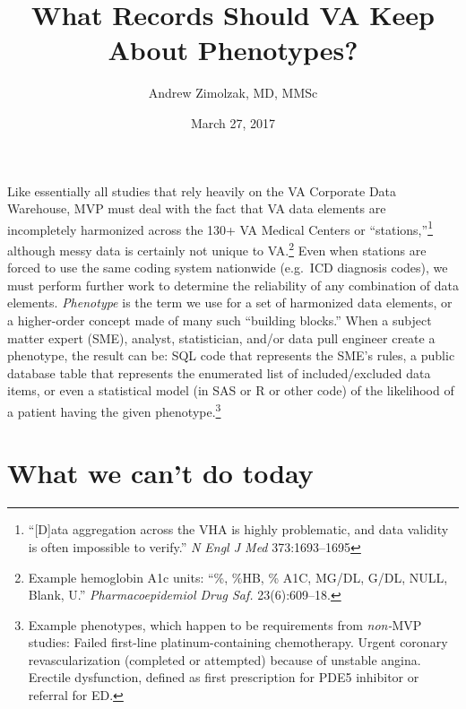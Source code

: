 \documentclass{tufte-handout}
\title{What Records Should VA Keep About Phenotypes?}
\author{Andrew Zimolzak, MD, MMSc}
\date{March 27, 2017}
\begin{document}
\maketitle

Like essentially all studies that rely heavily on the VA Corporate
Data Warehouse, MVP must deal with the fact that VA data elements are
incompletely harmonized across the 130+ VA Medical Centers or
``stations,''\footnote{``[D]ata aggregation across the VHA is highly
  problematic, and data validity is often impossible to verify.''
  \emph{N Engl J Med} 373:1693--1695} although messy data is certainly
not unique to VA.\footnote{Example hemoglobin A1c units: ``\%, \%HB,
  \% A1C, MG/DL, G/DL, NULL, Blank, U.'' \emph{Pharmacoepidemiol Drug
    Saf.} 23(6):609--18.} Even when stations are forced to use the
same coding system nationwide (e.g.\ ICD diagnosis codes), we must
perform further work to determine the reliability of any combination
of data elements. \emph{Phenotype} is the term we use for a set of
harmonized data elements, or a higher-order concept made of many such
``building blocks.'' When a subject matter expert (SME), analyst,
statistician, and/or data pull engineer create a phenotype, the result
can be: SQL code that represents the SME's rules, a public database
table that represents the enumerated list of included\slash excluded
data items, or even a statistical model (in SAS or R or other code) of
the likelihood of a patient having the given
phenotype.\footnote{Example phenotypes, which happen to be
  requirements from \emph{non-}MVP studies: Failed first-line
  platinum-containing chemotherapy. Urgent coronary revascularization
  (completed or attempted) because of unstable angina. Erectile
  dysfunction, defined as first prescription for PDE5 inhibitor or
  referral for ED.}

\section{What we can't do today}
\end{document}
